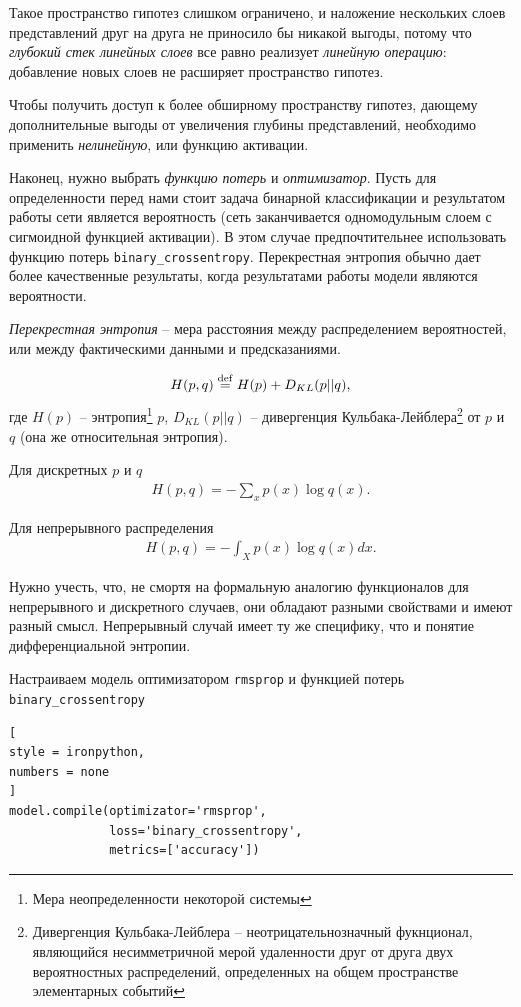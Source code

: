 \documentclass[%
	11pt,
	a4paper,
	utf8,
		]{article}
\begin{document}
Такое пространство гипотез слишком ограничено, и наложение нескольких слоев представлений друг на друга не приносило бы никакой выгоды, потому что \emph{глубокий стек линейных слоев} все равно реализует \emph{линейную операцию}: добавление новых слоев не расширяет пространство гипотез.

Чтобы получить доступ к более обширному пространству гипотез, дающему дополнительные выгоды от увеличения глубины представлений, необходимо применить \emph{нелинейную}, или функцию активации.

Наконец, нужно выбрать \emph{функцию потерь} и \emph{оптимизатор}. Пусть для определенности перед нами стоит задача бинарной классификации и результатом работы сети является вероятность (сеть заканчивается одномодульным слоем с сигмоидной функцией активации). В этом случае предпочтительнее использовать функцию потерь \texttt{binary\_crossentropy}. Перекрестная энтропия обычно дает более качественные результаты, когда результатами работы модели являются вероятности.

\emph{Перекрестная энтропия} -- мера расстояния между распределением вероятностей, или между фактическими данными и предсказаниями.

\begin{align*}
	H(p,q) \stackrel{\mathrm{def}}{=} H(p) + D_{KL}(p||q),
\end{align*}
где $ H(p) $ -- энтропия\footnote{Мера неопределенности некоторой системы} $ p $, $ D_{KL}(p||q) $ -- дивергенция Кульбака-Лейблера\footnote{Дивергенция Кульбака-Лейблера -- неотрицательнозначный фукнционал, являющийся несимметричной мерой удаленности друг от друга двух вероятностных распределений, определенных на общем пространстве элементарных событий} от $ p $ и $ q $ (она же относительная энтропия).

Для дискретных $ p $ и $ q $
\begin{align*}
	H(p,q) = - \sum_{x} p(x) \log q(x).
\end{align*}

Для непрерывного распределения
\begin{align*}
	H(p,q) = - \int_{X} p(x) \log q(x) dx.
\end{align*}

Нужно учесть, что, не смортя на формальную аналогию функционалов для непрерывного и дискретного случаев, они обладают разными свойствами и имеют разный смысл. Непрерывный случай имеет ту же специфику, что и понятие дифференциальной энтропии.

Настраиваем модель оптимизатором \texttt{rmsprop} и функцией потерь \texttt{binary\_crossentropy}
\begin{lstlisting}[
style = ironpython,
numbers = none
]
model.compile(optimizator='rmsprop',
              loss='binary_crossentropy',
              metrics=['accuracy'])
\end{lstlisting}
\end{document}
